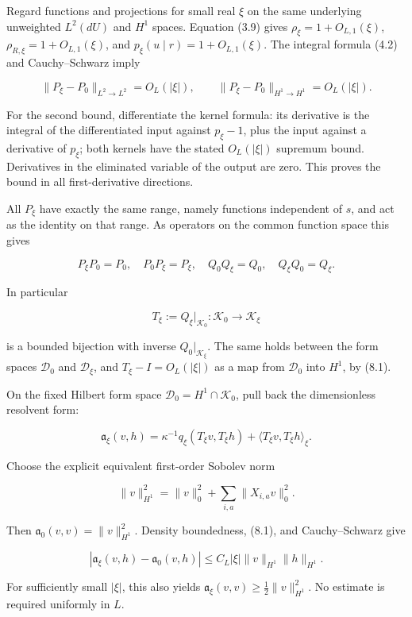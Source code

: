 Regard functions and projections for small real \(\xi\) on the same
underlying unweighted \(L^2(dU)\) and \(H^1\) spaces. Equation (3.9)
gives \(\rho_\xi=1+O_{L,1}(\xi)\), \(\rho_{R,\xi}=1+O_{L,1}(\xi)\), and
\(p_\xi(u\mid r)=1+O_{L,1}(\xi)\). The integral formula (4.2) and
Cauchy--Schwarz imply

\[
\|P_\xi-P_0\|_{L^2\to L^2}=O_L(|\xi|),\qquad
\|P_\xi-P_0\|_{H^1\to H^1}=O_L(|\xi|).
\tag{8.1}
\]

For the second bound, differentiate the kernel formula: its derivative
is the integral of the differentiated input against \(p_\xi-1\), plus
the input against a derivative of \(p_\xi\); both kernels have the
stated \(O_L(|\xi|)\) supremum bound. Derivatives in the eliminated
variable of the output are zero. This proves the bound in all
first-derivative directions.

All \(P_\xi\) have exactly the same range, namely functions independent
of \(s\), and act as the identity on that range. As operators on the
common function space this gives

\[
P_\xi P_0=P_0,\quad P_0P_\xi=P_\xi,
\quad Q_0Q_\xi=Q_0,\quad Q_\xi Q_0=Q_\xi.
\tag{8.2}
\]

In particular

\[
T_\xi:=Q_\xi|_{\mathcal K_0}:\mathcal K_0\longrightarrow\mathcal K_\xi
\]

is a bounded bijection with inverse \(Q_0|_{\mathcal K_\xi}\). The same
holds between the form spaces \(\mathcal D_0\) and \(\mathcal D_\xi\),
and \(T_\xi-I=O_L(|\xi|)\) as a map from \(\mathcal D_0\) into \(H^1\),
by (8.1).

On the fixed Hilbert form space \(\mathcal D_0=H^1\cap\mathcal K_0\),
pull back the dimensionless resolvent form:

\[
\mathfrak a_\xi(v,h)
=\kappa^{-1}q_\xi(T_\xi v,T_\xi h)
 +\langle T_\xi v,T_\xi h\rangle_\xi.
\tag{8.3}
\]

Choose the explicit equivalent first-order Sobolev norm

\[
\|v\|_{H^1}^2=\|v\|_0^2+\sum_{i,a}\|X_{i,a}v\|_0^2.
\]

Then \(\mathfrak a_0(v,v)=\|v\|_{H^1}^2\). Density boundedness, (8.1),
and Cauchy--Schwarz give

\[
|\mathfrak a_\xi(v,h)-\mathfrak a_0(v,h)|
\leq C_L|\xi|\|v\|_{H^1}\|h\|_{H^1}.
\tag{8.4}
\]

For sufficiently small \(|\xi|\), this also yields
\(\mathfrak a_\xi(v,v)\geq\tfrac12\|v\|_{H^1}^2\). No estimate is
required uniformly in \(L\).

